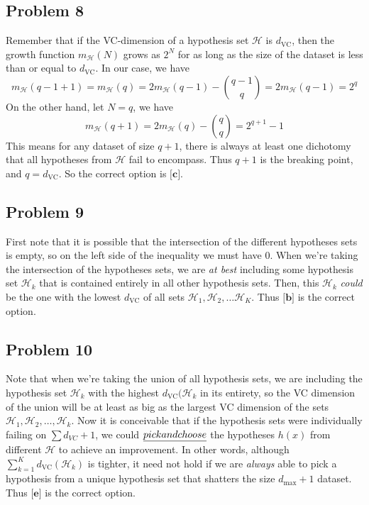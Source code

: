 \documentclass{article}
\begin{document}
\subsection*{Problem 8}
Remember that if the VC-dimension of a hypothesis set $\mathcal{H}$ is $d_{\text{VC}}$, then the growth function $m_{\mathcal{H}}(N)$ grows as $2^{N}$ for as long as the size of the dataset is less than or equal to $d_{\text{VC}}$. In our case, we have
\begin{equation*}
    m_{\mathcal{H}}(q - 1 + 1) = m_{\mathcal{H}}(q) = 2m_{\mathcal{H}}(q-1) - {{q-1}\choose{q}} = 2m_{\mathcal{H}}(q-1) = 2^{q}
\end{equation*}
On the other hand, let $N = q$, we have
\begin{equation*}
    m_{\mathcal{H}}(q + 1) = 2m_{\mathcal{H}}(q) - {{q}\choose{q}} = 2^{q+1} - 1
\end{equation*}
This means for any dataset of size $q+1$, there is always at least one dichotomy that all hypotheses from $\mathcal{H}$ fail to encompass. Thus $q+1$ is the breaking point, and $q = d_{\text{VC}}$. So the correct option is $\textbf{[c]}$.
\subsection*{Problem 9}
First note that it is possible that the intersection of the different hypotheses sets is empty, so on the left side of the inequality we must have 0. When we're taking the intersection of the hypotheses sets, we are \emph{at best} including some hypothesis set $\mathcal{H}_{k}$ that is contained entirely in all other hypothesis sets. Then, this $\mathcal{H}_{k}$ \emph{could} be the one with the lowest $d_{\text{VC}}$ of all sets $\mathcal{H}_{1}, \mathcal{H}_{2},\dots\mathcal{H}_{K}$. Thus $\textbf{[b]}$ is the correct option.
\subsection*{Problem 10}
Note that when we're taking the union of all hypothesis sets, we are including the hypothesis set $\mathcal{H}_{k}$ with the highest $d_{\text{VC}}(\mathcal{H}_{k}$ in its entirety, so the VC dimension of the union will be at least as big as the largest VC dimension of the sets $\mathcal{H}_{1}, \mathcal{H}_{2}, \dots,\mathcal{H}_{k}$. Now it is conceivable that if the hypothesis sets were individually failing on $\sum d_{VC} + 1$, we could $\emph{pick and choose}$ the hypotheses $h(x)$ from different $\mathcal{H}$ to achieve an improvement.  In other words, although $\sum_{k=1}^{K}d_{\text{VC}}(\mathcal{H}_{k})$ is tighter, it need not hold if we are \emph{always} able to pick a  hypothesis from a unique hypothesis set that shatters the size $d_{\text{max}} + 1$ dataset. Thus $\textbf{[e]}$ is the correct option.
\newpage
\end{document}
